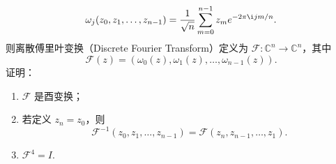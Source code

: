 \begin{exercise}
\begin{exgroup}
        \[
            \omega_j(z_0, z_1, \ldots, z_{n - 1}) = \dfrac{1}{\sqrt{n}}\sum_{m = 0}^{n - 1}z_m e^{-2\pi \i jm/n}.
        \]
        则离散傅里叶变换（Discrete Fourier Transform）定义为 $\mathcal{F}: \mathbb{C}^n \to \mathbb{C}^n$，其中 \[ \mathcal{F}(z) = (\omega_0(z), \omega_1(z), \ldots, \omega_{n - 1}(z)). \]
        证明：
        \begin{enumerate}
            \item $\mathcal{F}$ 是酉变换；
            \item 若定义 $z_n = z_0$，则 \[ \mathcal{F}^{-1}(z_0, z_1, \ldots, z_{n - 1}) = \mathcal{F}(z_n, z_{n - 1}, \ldots, z_1). \]
            \item $\mathcal{F}^4 = I$.
        \end{enumerate}
    \end{exgroup}
\end{exercise}
